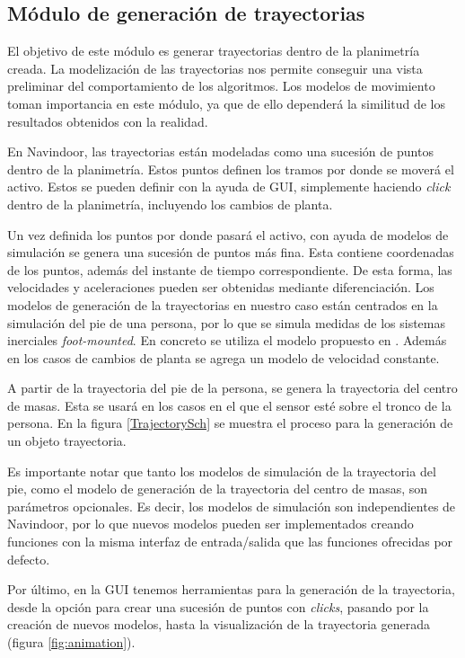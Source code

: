 \subsection{Módulo de generación de trayectorias}

El objetivo de este módulo es generar trayectorias dentro de la planimetría creada. La modelización de las trayectorias nos permite conseguir una vista preliminar del comportamiento de los algoritmos. Los modelos de movimiento toman importancia en este módulo, ya que de ello dependerá la similitud de los resultados obtenidos con la realidad.

En Navindoor, las trayectorias están modeladas como una sucesión de puntos dentro de la planimetría. Estos puntos definen los tramos por donde se moverá el activo. Estos se pueden definir con la ayuda de GUI, simplemente haciendo \emph{click} dentro de la planimetría, incluyendo los cambios de planta.

Un vez definida los puntos por donde pasará el activo, con ayuda de modelos de simulación se genera una sucesión de puntos más fina. Esta contiene  coordenadas de los puntos, además del instante de tiempo correspondiente. De esta forma, las velocidades y aceleraciones pueden ser obtenidas mediante diferenciación. Los modelos de generación de la trayectorias en nuestro caso están centrados en la simulación del pie de una persona, por lo que se simula medidas de los sistemas inerciales \emph{foot-mounted}. En concreto se utiliza el modelo propuesto en \cite{Zampella2011}. Además en los casos de cambios de planta se agrega un modelo de velocidad constante.

A partir de la  trayectoria del pie de la persona, se genera la trayectoria del centro de masas. Esta se usará en los casos en el que el sensor esté sobre el tronco de la persona. En la figura \ref{TrajectorySch} se muestra el proceso para la generación de un objeto trayectoria. 

Es importante notar que tanto los modelos de simulación de la trayectoria del pie, como el modelo de generación de la trayectoria del centro de masas, son parámetros opcionales. Es decir, los modelos de simulación son independientes de Navindoor, por lo que nuevos modelos pueden ser implementados creando funciones con la misma interfaz de entrada/salida que las funciones ofrecidas por defecto.

Por último, en la GUI tenemos herramientas para la generación de la trayectoria, desde la opción para crear una sucesión de puntos con \emph{clicks}, pasando por la creación de nuevos modelos, hasta la visualización de la trayectoria generada (figura \ref{fig:animation}).

